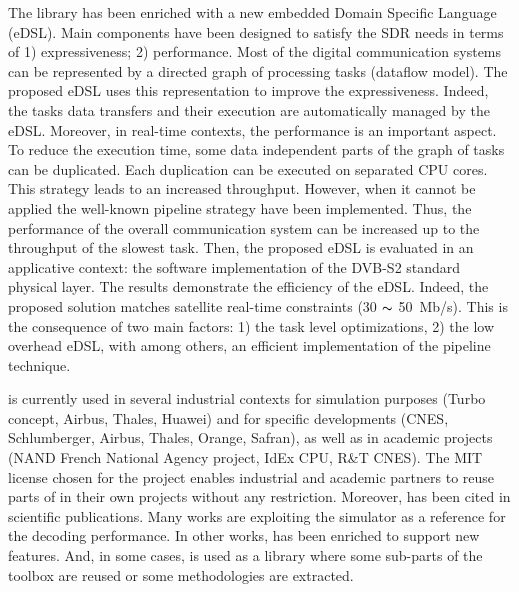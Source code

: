 The \AFFECT library has been enriched with a new embedded Domain Specific
Language (eDSL). Main components have been designed to satisfy the SDR needs in
terms of 1) expressiveness; 2) performance. Most of the digital communication
systems can be represented by a directed graph of processing tasks (dataflow
model). The proposed eDSL uses this representation to improve the
expressiveness. Indeed, the tasks data transfers and their execution are
automatically managed by the eDSL. Moreover, in real-time contexts, the
performance is an important aspect. To reduce the execution time, some data
independent parts of the graph of tasks can be duplicated. Each duplication can
be executed on separated CPU cores. This strategy leads to an increased
throughput. However, when it cannot be applied the well-known pipeline strategy
have been implemented. Thus, the performance of the overall communication system
can be increased up to the throughput of the slowest task. Then, the proposed
eDSL is evaluated in an applicative context: the software implementation of the
DVB-S2 standard physical layer. The results demonstrate the efficiency of the
\AFFECT eDSL. Indeed, the proposed solution matches satellite real-time
constraints (30 $\thicksim$ 50~Mb/s). This is the consequence of two main
factors: 1) the task level optimizations, 2) the low overhead eDSL, with among
others, an efficient implementation of the pipeline technique.

\AFFECT is currently used in several industrial contexts for simulation purposes
(Turbo concept, Airbus, Thales, Huawei) and for specific developments (CNES,
Schlumberger, Airbus, Thales, Orange, Safran), as well as in academic projects
(NAND French National Agency project, IdEx CPU, R\&T CNES). The MIT license
chosen for the project enables industrial and academic partners to reuse parts
of \AFFECT in their own projects without any restriction. Moreover, \AFFECT has
been cited in scientific publications. Many works are exploiting the \AFFECT
simulator as a reference for the decoding performance. In other works, \AFFECT
has been enriched to support new features. And, in some cases, \AFFECT is used
as a library where some sub-parts of the toolbox are reused or some
methodologies are extracted.

